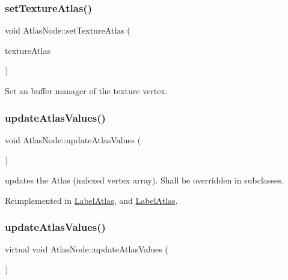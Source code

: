 \subsubsection{\texorpdfstring{set\+Texture\+Atlas()}{setTextureAtlas()}\hspace{0.1cm}{\footnotesize\ttfamily [2/2]}}
{\footnotesize\ttfamily void Atlas\+Node\+::set\+Texture\+Atlas (\begin{DoxyParamCaption}\item[{\hyperlink{classTextureAtlas}{Texture\+Atlas} $\ast$}]{texture\+Atlas }\end{DoxyParamCaption})}

Set an buffer manager of the texture vertex. \mbox{\label{classAtlasNode_ace1c88a0277a601bc02180da9641ebcd}} 
\subsubsection{\texorpdfstring{update\+Atlas\+Values()}{updateAtlasValues()}\hspace{0.1cm}{\footnotesize\ttfamily [1/2]}}
{\footnotesize\ttfamily void Atlas\+Node\+::update\+Atlas\+Values (\begin{DoxyParamCaption}{ }\end{DoxyParamCaption})\hspace{0.3cm}{\ttfamily [virtual]}}

updates the Atlas (indexed vertex array). Shall be overridden in subclasses. 

Reimplemented in \hyperlink{classLabelAtlas_a0075a4071c6da704b665bca30393ac5b}{Label\+Atlas}, and \hyperlink{classLabelAtlas_af70aa9b7820b00dfc6aa2c7291532fd6}{Label\+Atlas}.

\mbox{\label{classAtlasNode_a89a11eaf03df2a45123470c3ac87be22}} 
\subsubsection{\texorpdfstring{update\+Atlas\+Values()}{updateAtlasValues()}\hspace{0.1cm}{\footnotesize\ttfamily [2/2]}}
{\footnotesize\ttfamily virtual void Atlas\+Node\+::update\+Atlas\+Values (\begin{DoxyParamCaption}{ }\end{DoxyParamCaption})\hspace{0.3cm}{\ttfamily [virtual]}}

